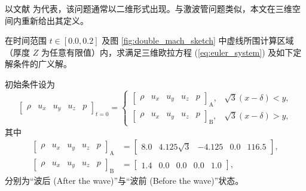 以文献 \cite{Woodward_1984} 为代表，该问题通常以二维形式出现。与激波管问题类似，本文在三维空间内重新给出其定义。
\begin{problem}
[双马赫反射]\label{prob:=0053CC=009A6C=008D6B=0053CD=005C04}在时间范围
$t\in[0.0,0.2]$ 及图 \ref{fig:double_mach_sketch} 中虚线所围计算区域（厚度 $Z$
为任意有限值）内，求满足三维欧拉方程 (\ref{eq:euler_system}) 及如下定解条件的广义解。

初始条件设为
\begin{equation}
\begin{bmatrix}\rho & u_{x} & u_{y} & u_{z} & p\end{bmatrix}_{t=0}=\begin{cases}
\begin{bmatrix}\rho & u_{x} & u_{y} & u_{z} & p\end{bmatrix}_{\mathrm{A}}, & \sqrt{3}(x-\delta)<y,\\
\begin{bmatrix}\rho & u_{x} & u_{y} & u_{z} & p\end{bmatrix}_{\mathrm{B}}, & \sqrt{3}(x-\delta)>y,
\end{cases}\label{eq:double_mach_ic}
\end{equation}
其中
\begin{equation}
\begin{aligned}\begin{bmatrix}\rho & u_{x} & u_{y} & u_{z} & p\end{bmatrix}_{\mathrm{A}} & =\begin{bmatrix}8.0 & 4.125\sqrt{3} & -4.125 & 0.0 & 116.5\end{bmatrix},\\
\begin{bmatrix}\rho & u_{x} & u_{y} & u_{z} & p\end{bmatrix}_{\mathrm{B}} & =\begin{bmatrix}1.4 & 0.0 & 0.0 & 0.0 & 1.0\end{bmatrix},
\end{aligned}
\end{equation}
分别为“波后 (After the wave)”与“波前 (Before the wave)”状态。


\end{problem}
